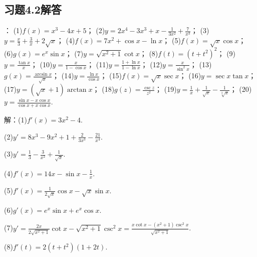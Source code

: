 \documentclass[12pt,UTF8]{ctexart}
\begin{document}
\subsection{习题4.2解答}
\begin{enumerate}
：
\newline
(1)$f(x)=x^3-4x+5$；
\newline
(2)$y=2x^4-3x^3+x-\frac1{3x^2}+\frac7{x^3}$；
\newline
(3)$y=\frac x3+\frac3x+2\sqrt x$；
\newline
(4)$f(x)=7x^2+\cos x-\ln x$；
\newline
(5)$f(x)=\sqrt x\cos x$；
\newline
(6)$g(x)=e^x\sin x$；
\newline
(7)$y=\sqrt{x^2+1}\cot x$；
\newline
(8)$f(t)=(t+t^2)^2$；
\newline
(9)$y=\frac{\tan x}x$；
\newline
(10)$y=\frac x{1-\cos x}$；
\newline
(11)$y=\frac{1+\ln x}{1-\ln x}$；
\newline
(12)$y=\frac{x}{\sin^2x}$；
\newline
(13)$g(x)=\frac{\arcsin x}{\sqrt x}$；
\newline
(14)$y=\frac{\ln x}{\cos x}$；
\newline
(15)$f(x)=\sqrt x\sec x$；
\newline
(16)$y=\sec x\tan x$；
\newline
(17)$y=(\sqrt x+1)\arctan x$；
\newline
(18)$g(z)=\frac{\csc z}{z^2}$；
\newline
(19)$y=\frac1x+\frac1{\sqrt x}-\frac1{\sqrt[3]x}$；
\newline
(20)$y=\frac{\sin x-x\cos x}{\cos x+x\cos x}$.

解：(1)$f'(x)=3x^2-4$.

(2)$y'=8x^3-9x^2+1+\frac2{3x^3}-\frac{21}{x^4}$.

(3)$y'=\frac13-\frac3{x^2}+\frac1{\sqrt x}$.

(4)$f'(x)=14x-\sin x-\frac1x$.

(5)$f'(x)=\frac1{2\sqrt x}\cos x-\sqrt x\sin x$.

(6)$g'(x)=e^x\sin x+e^x\cos x$.

(7)$y'=\frac{2x}{2\sqrt{x^2+1}}\cot x-\sqrt{x^2+1}\csc^2x=\frac{x\cot x-(x^2+1)\csc^2x}{\sqrt{x^2+1}}$.

(8)$f'(t)=2(t+t^2)(1+2t)$.


\end{enumerate}
\end{document}
